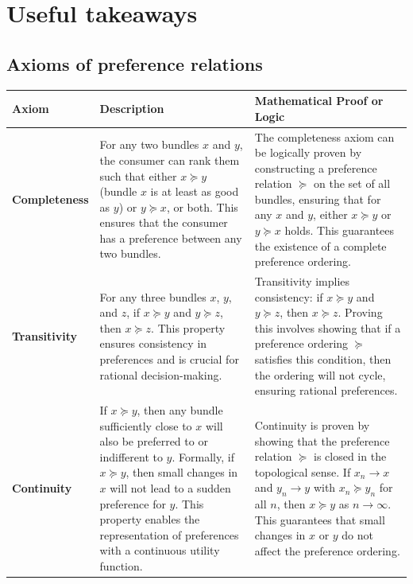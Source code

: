 \documentclass{article}
\begin{document}
\section{Useful takeaways}

\subsection{Axioms of preference relations}
\begin{table}[H]
    \centering
    \renewcommand{\arraystretch}{1.5}
    \setlength{\tabcolsep}{6pt} %
    \begin{tabular}{|>{\centering\arraybackslash}m{2.5cm}|>{\arraybackslash}m{7cm}|>{\arraybackslash}m{7cm}|}
        \hline
        \textbf{Axiom} & \textbf{Description} & \textbf{Mathematical Proof or Logic} \\ \hline
        \textbf{Completeness} & For any two bundles \( x \) and \( y \), the consumer can rank them such that either \( x \succeq y \) (bundle \( x \) is at least as good as \( y \)) or \( y \succeq x \), or both. This ensures that the consumer has a preference between any two bundles. & The completeness axiom can be logically proven by constructing a preference relation \( \succeq \) on the set of all bundles, ensuring that for any \( x \) and \( y \), either \( x \succeq y \) or \( y \succeq x \) holds. This guarantees the existence of a complete preference ordering. \\ \hline
        \textbf{Transitivity} & For any three bundles \( x \), \( y \), and \( z \), if \( x \succeq y \) and \( y \succeq z \), then \( x \succeq z \). This property ensures consistency in preferences and is crucial for rational decision-making. & Transitivity implies consistency: if \( x \succeq y \) and \( y \succeq z \), then \( x \succeq z \). Proving this involves showing that if a preference ordering \( \succeq \) satisfies this condition, then the ordering will not cycle, ensuring rational preferences. \\ \hline
        \textbf{Continuity} & If \( x \succeq y \), then any bundle sufficiently close to \( x \) will also be preferred to or indifferent to \( y \). Formally, if \( x \succeq y \), then small changes in \( x \) will not lead to a sudden preference for \( y \). This property enables the representation of preferences with a continuous utility function. & Continuity is proven by showing that the preference relation \( \succeq \) is closed in the topological sense. If \( x_n \to x \) and \( y_n \to y \) with \( x_n \succeq y_n \) for all \( n \), then \( x \succeq y \) as \( n \to \infty \). This guarantees that small changes in \( x \) or \( y \) do not affect the preference ordering. \\ \hline

\end{tabular}
\end{table}
\end{document}
